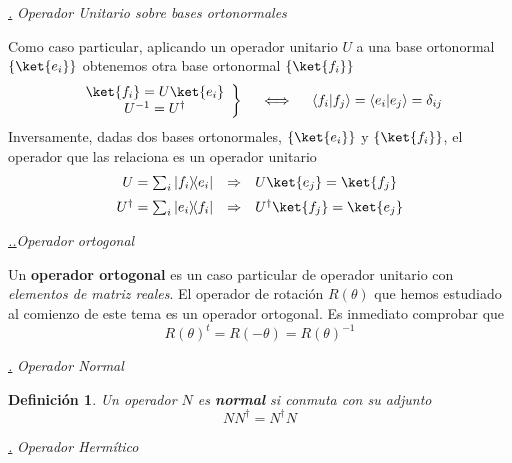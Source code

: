 \documentclass[a4paper,11pt]{book} %
\newtheorem{definicion_contador}{Definición}
\newcommand{\Definicion}[1]{
		\begin{mybox_gray2}{}
			\begin{definicion_contador}
				 #1 
			\end{definicion_contador} 
		\end{mybox_gray2}
	}
\numberwithin{equation}{chapter}
\newcommand{\braket}[2]{\langle #1|#2\rangle}
\newcommand{\ketbra}[2]{| #1\rangle \! \langle #2|}
\def\subsubiContadorIt{\par\addtocounter{subsubsection}{1}\underline{\it\thesubsubsection.}\hskip0.5cm \setcounter{subsubsubsectionIt}{0}}
\newcommand{\SubsubiIt}[1]{
		\subsubiContadorIt \textit{#1}
	}
\newcounter{subsubsubsectionIt}[subsubsection]
\def\subsubiiContadorIt{\par\addtocounter{subsubsubsectionIt}{1}\underline{\it \thesubsubsection.\thesubsubsubsectionIt.}\hskip0.5cm}
\newcommand{\SubsubiiIt}[1]{
		\subsubiiContadorIt \textit{#1}
	}
\begin{document}
			
			
			\SubsubiIt{Operador Unitario sobre bases ortonormales}
			
Como caso particular, aplicando un operador unitario $U$ a una base ortonormal $\{\ket{e_i}\}$ obtenemos otra base ortonormal $\{\ket{f_i}\}$
	\begin{equation}
\left. \begin{array}{c}\ket{f_i} = U\ket{e_i}\\ U^{-1} =  U^\dagger \end{array} \right\}
~~~~ \Longleftrightarrow ~~~~\braket{f_i}{f_j} = \braket{e_i}{e_j} = \delta_{ij}
	\end{equation}
 Inversamente, dadas dos bases ortonormales, $\{\ket{e_i}\}$ y $\{\ket{f_i}\}$, el operador que las relaciona es un operador unitario
 	\begin{equation}
 	 \begin{array}{rcl} 
U = \sum_i \ketbra{f_i}{e_i} & \Rightarrow &  U\ket{e_j} = \ket{f_j} 
 \\ \rule{0mm}{5mm}
U^\dagger = \sum_i \ketbra{e_i}{f_i}  & \Rightarrow &    U^\dagger\ket{f_j} = \ket{e_j} 
 \end{array}
 	\end{equation}


			\SubsubiiIt{Operador ortogonal}
			 
Un  \textbf{operador ortogonal} es un caso particular de operador  unitario con \textit{elementos de matriz reales}. El operador de rotación $R(\theta)$ que hemos estudiado al comienzo de este tema es un operador ortogonal. Es inmediato comprobar que 
$$ 
R(\theta)^t = R(-\theta) = R(\theta)^{-1}
$$


			\SubsubiIt{Operador Normal}

\Definicion{
Un operador $N$  es \textbf{normal} si conmuta con su adjunto
$$
NN^\dagger = N^\dagger N
$$
}


			\SubsubiIt{Operador Hermítico}
\end{document}
